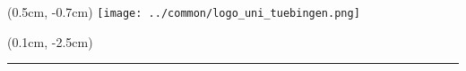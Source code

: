 {
\beamertemplatenavigationsymbolsempty %
\begin{frame}[plain] %
    \begin{textblock*}{0cm}(0.5cm, -0.7cm)
        \texttt{[image: ../common/logo\_uni\_tuebingen.png]}
    \end{textblock*}
    \titlepage
    \begin{textblock*}{0cm}(0.1cm, -2.5cm)
        \textcolor{university_tuebingen}{\rule{11.8cm}{0.2cm}}
    \end{textblock*}
\end{frame}
}
